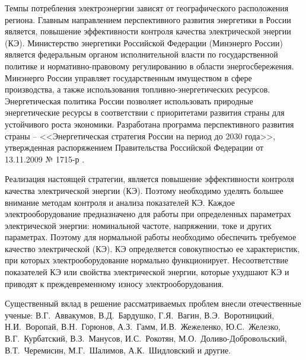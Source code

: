 Темпы потребления электроэнергии зависят от географического расположения региона. Главным направлением перспективного развития энергетики в России является, повышение эффективности контроля качества электрической энергии (КЭ). 
Министерство энергетики Российской Федерации (Минэнерго России) является федеральным органом исполнительной власти по государственной политике и нормативно-правовому регулированию в области энергосбережения. Минэнерго России управляет государственным имуществом в сфере производства, а также использования топливно-энергетических ресурсов. Энергетическая политика России позволяет использовать природные энергетические ресурсы в соответствии с приоритетами развития страны для устойчивого роста экономики. Разработана программа перспективного развития страны – <<Энергетическая стратегия России на период до 2030 года>>, утвержденная распоряжением Правительства Российской Федерации от 13.11.2009 № 1715-р \cite{энергетическая_стратеги2}.

Реализация настоящей стратегии, является повышение эффективности 
контроля качества электрической энергии (КЭ). Поэтому необходимо уделять большее внимание методам контроля и анализа показателей КЭ. 
Каждое электрооборудование предназначено для работы при определенных параметрах электрической энергии: номинальной частоте, напряжении, токе и других параметрах. Поэтому для нормальной работы необходимо обеспечить требуемое качество электрической (КЭ).  КЭ определяется совокупностью ее характеристик, при которых электрооборудование нормально функционирует. Несоответствие показателей КЭ или свойства электрической энергии, которые ухудшают КЭ и приводят к преждевременному износу электрооборудования. 

Существенный вклад в решение рассматриваемых проблем внесли отечественные ученые: В.Г.~Аввакумов, В.Д.~Бардушко, Г.Я.~Вагин, В.Э.~Воротницкий, Н.И.~Воропай, В.Н.~Горюнов, А.З.~Гамм, И.В.~Жежеленко, Ю.С.~Железко, В.Г.~Курбатский, В.З.~Манусов, И.С.~Рокотян, М.О.~Доливо-Добровольский, В.Т.~Черемисин, М.Г.~Шалимов, А.К.~Шидловский и другие. 

